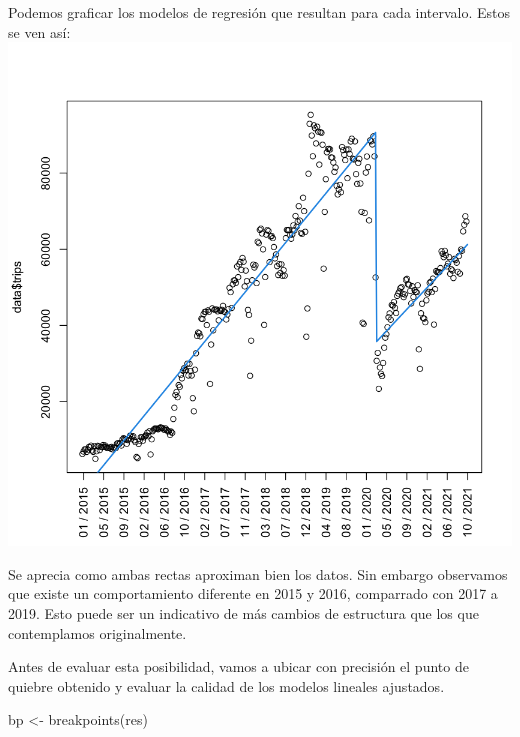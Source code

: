 \documentclass[
]{article}
\newenvironment{Shaded}{}{}
\newcommand{\FunctionTok}[1]{\textcolor[rgb]{0.02,0.16,0.49}{#1}}
\newcommand{\NormalTok}[1]{#1}
\newcommand{\OtherTok}[1]{\textcolor[rgb]{0.00,0.44,0.13}{#1}}
\newcommand{\SpecialCharTok}[1]{\textcolor[rgb]{0.25,0.44,0.63}{#1}}
\begin{document}
Podemos graficar los modelos de regresión que resultan para cada
intervalo. Estos se ven así:\\
\includegraphics{../plots/structChange_files/structChange_15_0.png}

Se aprecia como ambas rectas aproximan bien los datos. Sin embargo
observamos que existe un comportamiento diferente en 2015 y 2016,
comparrado con 2017 a 2019. Esto puede ser un indicativo de más cambios
de estructura que los que contemplamos originalmente.

Antes de evaluar esta posibilidad, vamos a ubicar con precisión el punto
de quiebre obtenido y evaluar la calidad de los modelos lineales
ajustados.

\begin{Shaded}
\begin{Highlighting}[]
\NormalTok{bp }\OtherTok{\textless{}{-}} \FunctionTok{breakpoints}\NormalTok{(res)}
\end{Highlighting}
\end{Shaded}

\begin{Shaded}
\end{Shaded}
\end{document}
